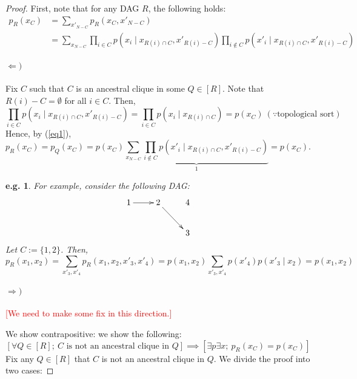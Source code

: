 \documentclass[11pt,a4paper,dvipdfmx]{article}
\theoremstyle{plain}
\newtheorem{eg}{e.g.}[section]
\newcommand{\ocomment}[1]{{\textcolor{red}{#1}}}
\begin{document}
\begin{proof}
	First, note that for any DAG $R$, the following holds:
	\begin{align}
		p_R(x_C) &= \sum_{x'_{N-C}} p_R(x_C, x'_{N-C}) \nonumber \\
		&=  \sum_{x_{N-C}}
		\prod_{i \in C} p(x_i \mid x_{R(i) \cap C}, x'_{R(i) - C})
		\prod_{i \notin C} p(x'_i \mid x_{R(i) \cap C}, x'_{R(i) - C}) \label{eq1}
	\end{align}
	
	\paragraph{$\Leftarrow)$}
	Fix $C$ such that $C$ is an ancestral clique in some $Q \in [R]$. Note that $R(i) - C = \emptyset$ for all $i \in C$. Then,
	\[
	\prod_{i \in C} p(x_i \mid x_{R(i) \cap C}, x'_{R(i) - C})
	= \prod_{i \in C} p(x_i \mid x_{R(i) \cap C})
	= p(x_C) \ (\because \text{topological sort})
	\]
	Hence, by (\ref{eq1}),
	\[
	p_R(x_C) = p_Q(x_C) = p(x_C)
	\underbrace{\sum_{x_{N-C}}
		\prod_{i \notin C} p(x'_i \mid x_{R(i) \cap C}, x'_{R(i) - C})}_{1} = p(x_C).
	\]
	
	\begin{screen}
	\begin{eg}
		For example, consider the following DAG:
		\[
		\xymatrix{
			1 \ar[r] & 2 \ar[rd] & 4 \\
			& & 3
		}
		\]
		Let $C:=\{1,2\}$. Then,
		\[
		p_R(x_1, x_2) = 
		\sum_{x'_3, x'_4} p_R(x_1, x_2, x'_3, x'_4)
		= p(x_1, x_2) \sum_{x'_3, x'_4} p(x'_4) p(x'_3 \mid x_2)
		= p(x_1, x_2)
		\]
	\end{eg}
	\end{screen}
	
	\paragraph{$\Rightarrow)$}
	\ocomment{[We need to make some fix in this direction.]}
	
	We show contrapositive: we show the following:
	\[
	[\forall Q \in [R]; \ C \text{ is not an ancestral clique in } Q]
	\implies
	[\exists p  \exists x; \ p_R(x_C) = p(x_C)]
	\]
	Fix any $Q \in [R]$ that $C$ is not an ancestral clique in $Q$. We divide the proof into two cases:

\end{proof}
\end{document}
